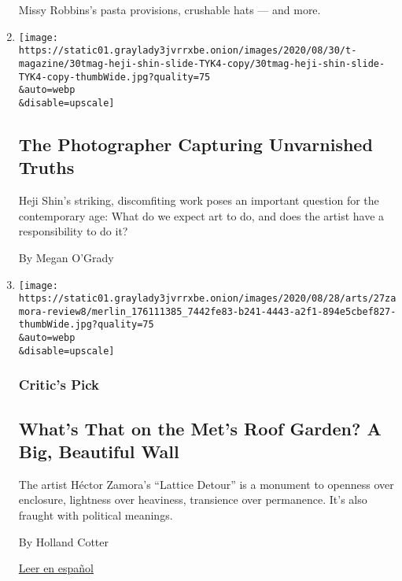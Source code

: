 \begin{enumerate}
  Missy Robbins's pasta provisions, crushable hats --- and more.
\item
  \href{/2020/08/27/t-magazine/heji-shin-photographer-babies.html}{}

  \texttt{[image: https://static01.graylady3jvrrxbe.onion/images/2020/08/30/t-magazine/30tmag-heji-shin-slide-TYK4-copy/30tmag-heji-shin-slide-TYK4-copy-thumbWide.jpg?quality=75\\\&auto=webp\\\&disable=upscale]}

  \hypertarget{the-photographer-capturing-unvarnished-truths}{%
  \subsection{The Photographer Capturing Unvarnished
  Truths}\label{the-photographer-capturing-unvarnished-truths}}

  Heji Shin's striking, discomfiting work poses an important question
  for the contemporary age: What do we expect art to do, and does the
  artist have a responsibility to do it?

  By Megan O'Grady
\item
  \href{/2020/08/27/arts/design/met-roof-hector-zamora-wall.html}{}

  \texttt{[image: https://static01.graylady3jvrrxbe.onion/images/2020/08/28/arts/27zamora-review8/merlin\_176111385\_7442fe83-b241-4443-a2f1-894e5cbef827-thumbWide.jpg?quality=75\\\&auto=webp\\\&disable=upscale]}

  \hypertarget{critics-pick-1}{%
  \subsubsection{Critic's Pick}\label{critics-pick-1}}

  \hypertarget{whats-that-on-the-mets-roof-garden-a-big-beautiful-wall}{%
  \subsection{What's That on the Met's Roof Garden? A Big, Beautiful
  Wall}\label{whats-that-on-the-mets-roof-garden-a-big-beautiful-wall}}

  The artist Héctor Zamora's ``Lattice Detour'' is a monument to
  openness over enclosure, lightness over heaviness, transience over
  permanence. It's also fraught with political meanings.

  By Holland Cotter

  \href{https://www.nytimes3xbfgragh.onion/es/2020/08/31/espanol/cultura/hector-zamora-met.html}{Leer
  en español}
\end{enumerate}

